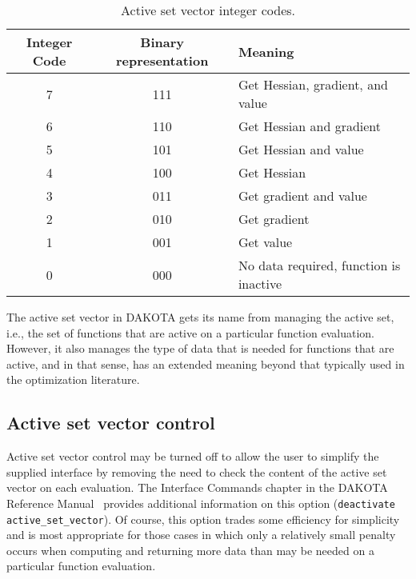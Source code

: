 \begin{table}
  \centering
  \caption{Active set vector integer codes.}
  \label{variables:table01}\vspace{2mm}
  \begin{tabular}{|c|c|l|}
    \hline
    Integer Code & Binary representation & Meaning \\
    \hline
    7 & 111 & Get Hessian, gradient, and value \\
    6 & 110 & Get Hessian and gradient \\
    5 & 101 & Get Hessian and value \\
    4 & 100 & Get Hessian \\
    3 & 011 & Get gradient and value \\
    2 & 010 & Get gradient \\
    1 & 001 & Get value \\
    0 & 000 & No data required, function is inactive \\
    \hline
  \end{tabular}
\end{table}

The active set vector in DAKOTA gets its name from managing the active
set, i.e., the set of functions that are active on a particular
function evaluation. However, it also manages the type of data that is
needed for functions that are active, and in that sense, has an
extended meaning beyond that typically used in the optimization
literature.

\subsection{Active set vector control}\label{variables:asv:control}

Active set vector control may be turned off to allow the user to
simplify the supplied interface by removing the need to check the
content of the active set vector on each evaluation. The Interface
Commands chapter in the DAKOTA Reference Manual~\cite{RefMan} provides
additional information on this option (\texttt{deactivate
active\_set\_vector}).  Of course, this option trades some efficiency
for simplicity and is most appropriate for those cases in which only a
relatively small penalty occurs when computing and returning more data
than may be needed on a particular function evaluation.
